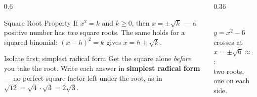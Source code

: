 \documentclass[aspectratio=169, 11pt]{beamer}
\newcommand{\lgrid}[4]{%
  \draw[step=1, linegray!45, thin] (#1,#3) grid (#2,#4);
  \draw[->, thick, charcoal] (#1,0)--(#2,0) node[below right, font=\tiny]{$x$};
  \draw[->, thick, charcoal] (0,#3)--(0,#4) node[left, font=\tiny]{$y$};}
\begin{document}
\begin{frame}[t, plain]
  \begin{columns}[T]
    \begin{column}{0.6\textwidth}
      \begin{block}{Square Root Property}
        If $x^2=k$ and $k\ge0$, then $x=\pm\sqrt{k}$ --- a positive number has \emph{two}
        square roots. The same holds for a squared binomial: $(x-h)^2=k$ gives
        $x=h\pm\sqrt{k}$.
      \end{block}
      \vspace{2pt}
      \begin{block}{Isolate first; simplest radical form}
        Get the square alone \emph{before} you take the root. Write each answer in
        \textbf{simplest radical form} --- no perfect-square factor left under the root, as in
        $\sqrt{12}=\sqrt4\cdot\sqrt3=2\sqrt3$.
      \end{block}
    \end{column}
    \begin{column}{0.36\textwidth}
      \centering
      \\[-2pt]
      {\scriptsize $y=x^2-6$ crosses at $x=\pm\sqrt6\approx\pm2.45$: \\ two roots, one on each
      side.}
    \end{column}
  \end{columns}
\end{frame}
\end{document}
